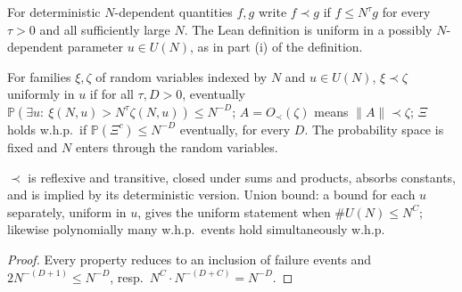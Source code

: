 \begin{definition}\label{def:2.1-ii}
  \leanok
  For deterministic $N$-dependent quantities $f,g$ write $f\prec g$ if
  $f\le N^\tau g$ for every $\tau>0$ and all sufficiently large $N$.  The Lean
  definition is uniform in a possibly $N$-dependent parameter $u\in U(N)$, as in
  part (i) of the definition.
\end{definition}

\begin{definition}\label{def:2.1-i}
  \leanok
  For families $\xi,\zeta$ of random variables indexed by $N$ and $u\in U(N)$, $\xi\prec\zeta$
  uniformly in $u$ if for all $\tau,D>0$, eventually
  $\mathbb P(\exists u:\ \xi(N,u)>N^\tau\zeta(N,u))\le N^{-D}$; $A=O_\prec(\zeta)$ means
  $\|A\|\prec\zeta$; $\Xi$ holds w.h.p.\ if $\mathbb P(\Xi^c)\le N^{-D}$ eventually, for every $D$.
  The probability space is fixed and $N$ enters through the random variables.
\end{definition}

\begin{lemma}\label{lem:2.1-i-closure}
  \leanok{}
  $\prec$ is reflexive and transitive, closed under sums and products, absorbs constants, and is
  implied by its deterministic version.  Union bound: a bound for each $u$ separately, uniform in
  $u$, gives the uniform statement when $\#U(N)\le N^C$; likewise polynomially many w.h.p.\ events
  hold simultaneously w.h.p.
\end{lemma}
\begin{proof}\leanok
  Every property reduces to an inclusion of failure events and $2N^{-(D+1)}\le N^{-D}$,
  resp.\ $N^C\cdot N^{-(D+C)}=N^{-D}$.
\end{proof}

